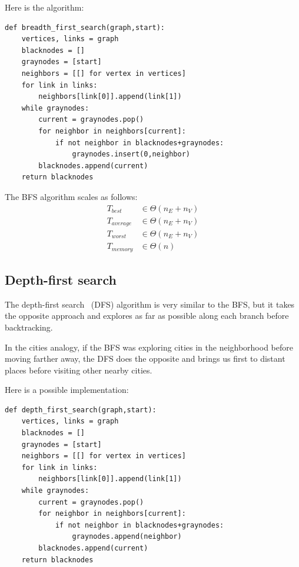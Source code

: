 \documentclass[justified,sixbynine]{tufte-book}
\def\ft{\small\tt}
\theoremstyle{plain}%
\theoremstyle{definition}
\theoremstyle{remark}
\begin{document}
\begin{fullwidth}
Here is the algorithm:

\begin{lstlisting}[caption={in file: {\ft nlib.py}}]
def breadth_first_search(graph,start):
    vertices, links = graph
    blacknodes = []
    graynodes = [start]
    neighbors = [[] for vertex in vertices]
    for link in links:
        neighbors[link[0]].append(link[1])
    while graynodes:
        current = graynodes.pop()
        for neighbor in neighbors[current]:
            if not neighbor in blacknodes+graynodes:
                graynodes.insert(0,neighbor)
        blacknodes.append(current)
    return blacknodes
\end{lstlisting}

The BFS algorithm scales as follows:
\begin{align}
T_{best} &\in \Theta (n_E+n_V) \\
T_{average} &\in \Theta (n_E+n_V) \\
T_{worst} &\in \Theta (n_E+n_V) \\
T_{memory} &\in \Theta (n)
\end{align}

\subsection{Depth-first search}


The depth-first search~\cite{dfs} (DFS) algorithm is very similar to the BFS, but it takes the opposite approach and explores as far as possible along each branch before backtracking.

In the cities analogy, if the BFS was exploring cities in the neighborhood before moving farther away, the DFS does the opposite and brings us first to distant places before visiting other nearby cities.

Here is a possible implementation:

\begin{lstlisting}[caption={in file: {\ft nlib.py}}]
def depth_first_search(graph,start):
    vertices, links = graph
    blacknodes = []
    graynodes = [start]
    neighbors = [[] for vertex in vertices]
    for link in links:
        neighbors[link[0]].append(link[1])
    while graynodes:
        current = graynodes.pop()
        for neighbor in neighbors[current]:
            if not neighbor in blacknodes+graynodes:
                graynodes.append(neighbor)
        blacknodes.append(current)
    return blacknodes
\end{lstlisting}


\end{fullwidth}
\end{document}
